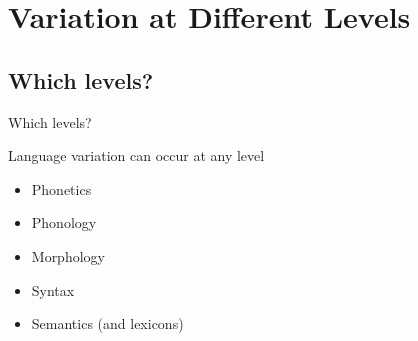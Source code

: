\documentclass{beamer}
\subtitle[Variation at Different Levels]{Variation at Different Levels of Linguistic Structure}
\newcommand{\suboneone}{Which levels?}
\begin{document}
  

  \section{Variation at Different Levels}
    \subsection{\suboneone}
      \begin{frame}{\suboneone}
        \begin{block}{Language variation can occur at any level}
          \begin{itemize}
            \item Phonetics
            \item Phonology
            \item Morphology
            \item Syntax
            \item Semantics (and lexicons)
          \end{itemize}
        \end{block}
      \end{frame}
\end{document}

